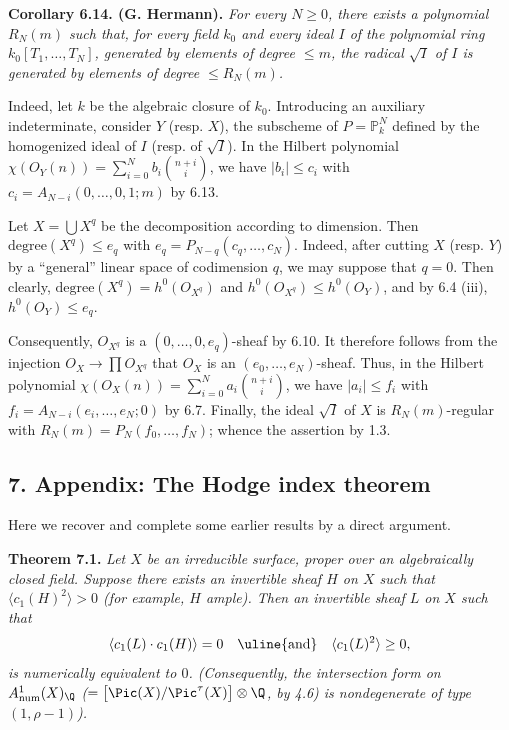 %
\textbf{Corollary 6.14. (G. Hermann).} \emph{For every $N\ge0$, there exists a polynomial $R_N(m)$ such that, for every field $k_0$ and every ideal $I$ of the polynomial ring $k_0[T_1,\ldots,T_N]$, generated by elements of degree $\le m$, the radical $\sqrt I$ of $I$ is generated by elements of degree $\le R_N(m)$.}

Indeed, let $k$ be the algebraic closure of $k_0$. Introducing an auxiliary indeterminate, consider $Y$ (resp. $X$), the subscheme of $P=\mathbb P^N_k$ defined by the homogenized ideal of $I$ (resp. of $\sqrt I$). In the Hilbert polynomial $\chi({O}_Y(n))=\sum_{i=0}^{N}b_i\binom{n+i}{i}$, we have $|b_i|\le c_i$ with $c_i=A_{N-i}(0,\ldots,0,1;m)$ by 6.13.

Let $X=\bigcup X^q$ be the decomposition according to dimension. Then $\text{degree}(X^q)\le e_q$ with $e_q=P_{N-q}(c_q,\ldots,c_N)$. Indeed, after cutting $X$ (resp. $Y$) by a ``general'' linear space of codimension $q$, we may suppose that $q=0$. Then clearly, $\text{degree}(X^q)=h^0({O}_{X^q})$ and $h^0({O}_{X^q})\le h^0({O}_Y)$, and by 6.4 (iii), $h^0({O}_Y)\le e_q$.

Consequently, ${O}_{X^q}$ is a $(0,\ldots,0,e_q)$-sheaf by 6.10. It therefore follows from the injection ${O}_X\to \prod{O}_{X^q}$ that ${O}_X$ is an $(e_0,\ldots,e_N)$-sheaf. Thus, in the Hilbert polynomial $\chi({O}_X(n))=\sum_{i=0}^{N}a_i\binom{n+i}{i}$, we have $|a_i|\le f_i$ with $f_i=A_{N-i}(e_i,\ldots,e_N;0)$ by 6.7. Finally, the ideal $\sqrt I$ of $X$ is $R_N(m)$-regular with $R_N(m)=P_N(f_0,\ldots,f_N)$; whence the assertion by 1.3.

%
\subsection*{7. Appendix: The Hodge index theorem}

Here we recover and complete some earlier results by a direct argument.

\textbf{Theorem 7.1.} \emph{Let $X$ be an irreducible surface, proper over an algebraically closed field. Suppose there exists an invertible sheaf $H$ on $X$ such that $\langle c_1(H)^2\rangle>0$ (for example, $H$ ample). Then an invertible sheaf $L$ on $X$ such that}
\[
   \langle c_1(L)\cdot c_1(H)\rangle=0
   \quad\hbox{\uline{and}}\quad
   \langle c_1(L)^2\rangle\geq 0,
\]
\emph{is numerically equivalent to $0$. (Consequently, the intersection form on $A^1_{\mathrm{num}}(X)_{\Q}$ ($=\bigl[\Pic(X)/\Pic^\tau(X)\bigr]\otimes\Q$, by 4.6) is nondegenerate of type $(1,\rho-1)$).}

